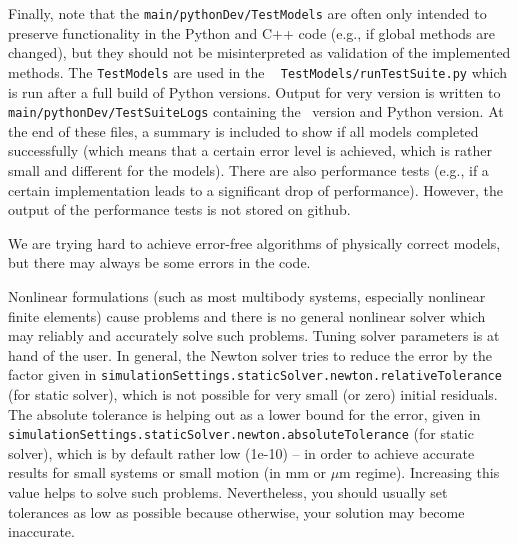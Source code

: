 Finally, note that the \texttt{main/pythonDev/TestModels} are often only intended to preserve functionality
in the Python and C++ code (e.g., if global methods are changed), but they should not be misinterpreted as validation of the 
implemented methods. The \texttt{TestModels} are used in the \codeName\  \texttt{TestModels/runTestSuite.py}
which is run after a full build of Python versions. Output for very version is written
to \texttt{main/pythonDev/TestSuiteLogs} containing the \codeName\ version and Python version. At the end of these
files, a summary is included to show if all models completed successfully (which means that a certain error level is achieved, which is rather small and different for the models).
There are also performance tests (e.g., if a certain implementation leads to a significant drop of performance).
However, the output of the performance tests is not stored on github.

We are trying hard to achieve error-free algorithms of physically correct models, but there may always be some errors in the code.

\label{secConvergenceProblems}
Nonlinear formulations (such as most multibody systems, especially nonlinear finite elements) cause problems and there is no general nonlinear solver which may reliably and accurately solve such problems.
Tuning solver parameters is at hand of the user. 
In general, the Newton solver tries to reduce the error by the factor given in \texttt{simulationSettings.staticSolver.newton.relativeTolerance} (for static solver), which is not possible for very small (or zero) initial residuals. The absolute tolerance is helping out as a lower bound for the error, given in \texttt{simulationSettings.staticSolver.newton.absoluteTolerance} (for static solver), which is by default rather low (1e-10) -- in order to achieve accurate results for small systems or small motion (in mm or $\mu$m regime). Increasing this value helps to solve such problems. Nevertheless, you should usually set tolerances as low as possible because otherwise, your solution may become inaccurate.

